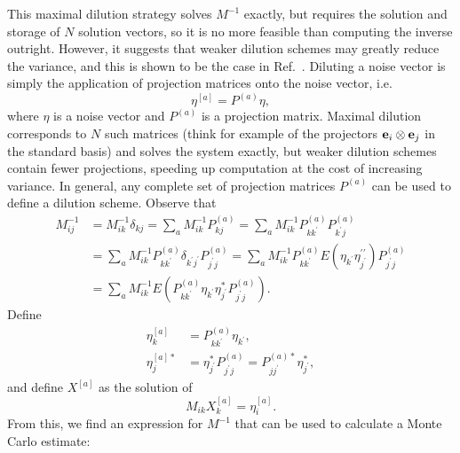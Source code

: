 This maximal dilution strategy solves $M^{-1}$ exactly, but requires the solution and storage of $N$ solution vectors, so it is no more feasible than computing the inverse outright. However, it suggests that weaker dilution schemes may greatly reduce the variance, and this is shown to be the case in Ref.~\cite{Morningstar:2011ka}. Diluting a noise vector is simply the application of projection matrices onto the noise vector, i.e.\
\begin{equation}
    \eta^{[a]} = P^{(a)} \eta,
\end{equation}
where $\eta$ is a noise vector and $P^{(a)}$ is a projection matrix. Maximal dilution corresponds to $N$ such matrices (think for example of the projectors $\vb e_i \otimes \vb e_j$ in the standard basis) and solves the system exactly, but weaker dilution schemes contain fewer projections, speeding up computation at the cost of increasing variance. In general, any complete set of projection matrices $P^{(a)}$ can be used to define a dilution scheme. Observe that
\begin{equation}
\begin{aligned} M_{i j}^{-1} &=M_{i k}^{-1} \delta_{k j}=\sum_{a} M_{i k}^{-1} P_{k j}^{(a)}=\sum_{a} M_{i k}^{-1} P_{k k^{\prime}}^{(a)} P_{k^{\prime} j}^{(a)} \\ &=\sum_{a} M_{i k}^{-1} P_{k k^{\prime}}^{(a)} \delta_{k^{\prime} j^{\prime}} P_{j^{\prime} j}^{(a)}=\sum_{a} M_{i k}^{-1} P_{k k^{\prime}}^{(a)} E\left(\eta_{k^{\prime}} \eta_{j^{\prime}}^{\prime \prime}\right) P_{j^{\prime} j}^{(a)} \\ &=\sum_{a} M_{i k}^{-1} E\left(P_{k k^{\prime}}^{(a)} \eta_{k^{\prime}} \eta_{j^{\prime}}^{*} P_{j^{\prime} j}^{(a)}\right). \end{aligned}
\end{equation}
Define
\begin{equation}
    \begin{aligned}
    \eta_{k}^{[a]}&=P_{k k^{\prime}}^{(a)} \eta_{k^{\prime}},\\
    \eta_{j}^{[a] *}&=\eta_{j^{\prime}}^{*} P_{j^{\prime} j}^{(a)}=P_{j j^{\prime}}^{(a) *} \eta_{j^{\prime}}^{*},
    \end{aligned}
\end{equation}
and define $X^{[a]}$ as the solution of
\begin{equation}
    M_{i k} X_{k}^{[a]}=\eta_{i}^{[a]}.
\end{equation}
From this, we find an expression for $M^{-1}$ that can be used to calculate a Monte Carlo estimate:

